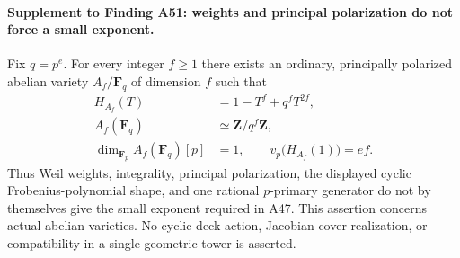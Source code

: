 \documentclass[11pt,a4paper]{article}
\begin{document}
\paragraph{Supplement to Finding A51: weights and principal polarization do not force a small exponent.}
Fix $q=p^e$. For every integer $f\ge1$ there exists an ordinary,
principally polarized abelian variety $A_f/\mathbf F_q$ of dimension
$f$ such that
\[
 \begin{aligned}
 H_{A_f}(T)&=1-T^f+q^fT^{2f},\\
 A_f(\mathbf F_q)&\simeq\mathbf Z/q^f\mathbf Z,\\
 \dim_{\mathbf F_p}A_f(\mathbf F_q)[p]&=1,
 \qquad v_p\bigl(H_{A_f}(1)\bigr)=ef.
 \end{aligned}
 \tag{WV.1}
\]
Thus Weil weights, integrality, principal polarization, the displayed
cyclic Frobenius-polynomial shape, and one rational $p$-primary
generator do not by themselves give the small exponent required in
A47. This assertion concerns actual abelian varieties. No cyclic
deck action, Jacobian-cover realization, or compatibility in a
single geometric tower is asserted.
\end{document}
